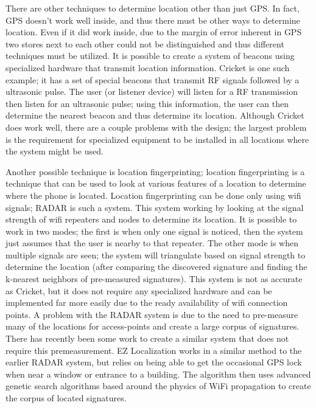 \documentclass{acm_proc_article-sp}
\begin{document}
There are other techniques to determine location other than just GPS.  In fact, GPS doesn't work well inside, and thus there must be other ways to determine location.  Even if it did work inside, due to the margin of error inherent in GPS two stores next to each other could not be distinguished and thus different techniques must be utilized. It is possible to create a system of beacons using specialized hardware that transmit location information.  Cricket is one such example; it has a set of special beacons that transmit RF signals followed by a ultrasonic pulse.  The user (or listener device) will listen for a RF transmission then listen for an ultrasonic pulse; using this information, the user can then determine the nearest beacon and thus determine its location.  Although Cricket does work well, there are a couple problems with the design; the largest problem is the requirement for specialized equipment to be installed in all locations where the system might be used. \cite{priyantha2000cricket}  

Another possible technique is location fingerprinting; location fingerprinting is a technique that can be used to look at various features of a location to determine where the phone is located. Location fingerprinting can be done only using wifi signals; RADAR \cite{bahl2000radar} is such a system.  This system working by looking at the signal strength of wifi repeaters and nodes to determine its location. It is possible to work in two modes; the first is when only one signal is noticed, then the system just assumes that the user is nearby to that repeater.  The other mode is when multiple signals are seen; the system will triangulate based on signal strength to determine the location (after comparing the discovered signature and finding the k-nearest neighbors of pre-measured signatures).  This system is not as accurate as Cricket, but it does not require any specialized hardware and can be implemented far more easily due to the ready availability of wifi connection points.  \cite{bahl2000radar}  A problem with the RADAR system is due to the need to pre-measure many of the locations for access-points and create a large corpus of signatures. There has recently been some work to create a similar system that does not require this premeasurement.  EZ Localization works in a similar method to the earlier RADAR system, but relies on being able to get the occasional GPS lock when near a window or entrance to a building. The algorithm then uses advanced genetic search algorithms based around the physics of WiFi propagation to create the corpus of located signatures.  \cite{chintalapudi2010indoor}
\end{document}
